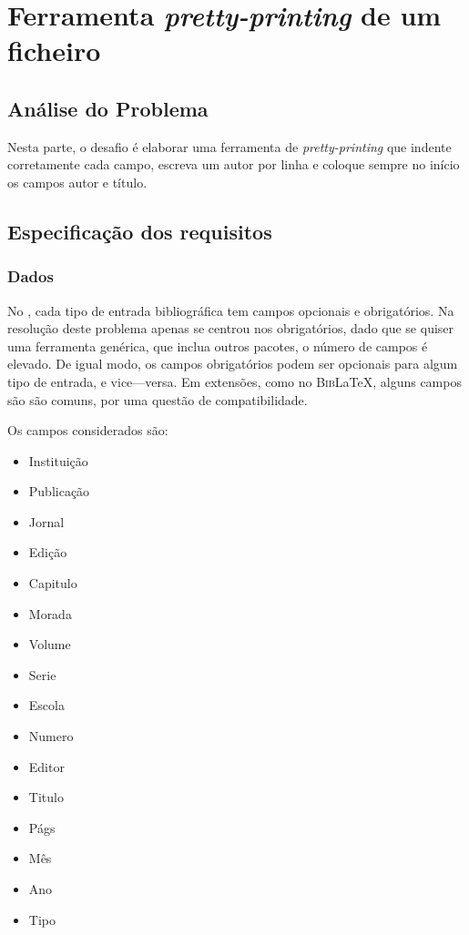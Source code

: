\chapter{Ferramenta \emph{pretty-printing} de um ficheiro }
\label{chap:b2}

\section{Análise do Problema}
\label{sec:b2p:b2}
Nesta parte, o desafio é elaborar uma ferramenta de \emph{pretty-printing} que
indente corretamente cada campo, escreva um autor por linha e coloque sempre no
início os campos autor e título.

\section{Especificação dos requisitos}
\label{sec:spec:b2}

\subsection{Dados}

No , cada tipo de entrada bibliográfica tem campos opcionais
e obrigatórios. Na resolução deste problema apenas se centrou nos obrigatórios,
dado que se quiser uma ferramenta genérica, que inclua outros pacotes, o número
de campos é elevado. De igual modo, os campos obrigatórios podem ser opcionais
para algum tipo de entrada, e vice---versa. Em extensões, como no
\textsc{Bib}\LaTeX{}, alguns campos são são comuns, por uma questão de compatibilidade.

Os campos considerados são:

\begin{itemize}

\item Instituição
\item Publicação
\item Jornal
\item Edição
\item Capitulo
\item Morada
\item Volume
\item Serie
\item Escola
\item Numero
\item Editor
\item Titulo
\item Págs
\item Mês
\item Ano
\item Tipo

\end{itemize}

